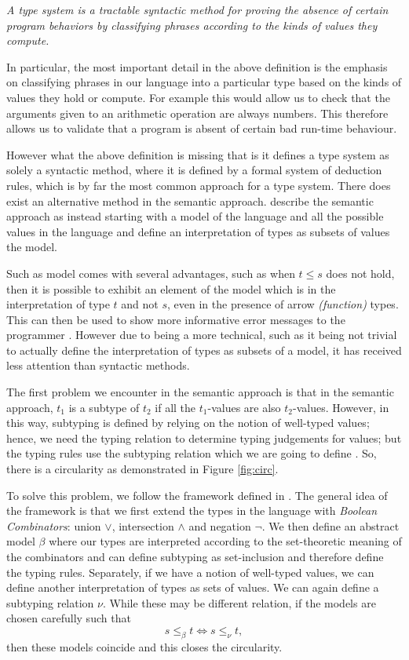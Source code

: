 \documentclass{l4proj}
\begin{document}
\textit{A type system is a tractable syntactic method for proving the absence of certain program
    behaviors by classifying phrases according to the kinds of values they compute.}

In particular, the most important detail in the above definition is the emphasis on classifying 
phrases in our language into a particular type based on the kinds of values they hold or compute. 
For example this would allow us to check that the arguments given to an arithmetic operation are 
always numbers. This therefore allows us to validate that a program is absent of certain bad 
run-time behaviour.

However what the above definition is missing that is it defines a type system as solely a syntactic 
method, where it is defined by a formal system of deduction rules, which is by far the most common 
approach for a type system. There does exist an alternative method in the semantic approach. 
\citet{Frisch2002} describe the semantic approach as instead starting with a model of the language 
and all the possible values in the language and define an interpretation of types as subsets of 
values the model.

Such as model comes with several advantages, such as when $t \leq s$ does not hold, then it is
possible to exhibit an element of the model which is in the interpretation of type $t$ and not $s$, 
even in the presence of arrow \textit{(function)} types. This can then be used to show more 
informative error messages to the programmer \citep{Castagna2005}. However due to being a more 
technical, such as it being not trivial to actually define the interpretation of types as subsets of
a model, it has received less attention than syntactic methods.

The first problem we encounter in the semantic approach is that in the semantic approach, $t_{1}$
is a subtype of $t_{2}$ if all the $t_{1}$-values are also $t_{2}$-values. However, in this way, 
subtyping is defined by relying on the notion of well-typed values; hence, we need the typing 
relation to determine typing judgements for values; but the typing rules use the subtyping relation
which we are going to define \citep{Dardha2017}. So, there is a circularity as demonstrated in 
Figure \ref{fig:circ}.

To solve this problem, we follow the framework defined in \citep{Frisch2008}. The general idea of
the framework is that we first extend the types in the language with \textit{Boolean Combinators}: 
union $\lor$, intersection $\land$ and negation $\neg$. We then define an abstract model $\beta$ 
where our types are interpreted according to the set-theoretic meaning of the combinators and can 
define subtyping as set-inclusion and therefore define the typing rules. Separately, if we have a 
notion of well-typed values, we can define another interpretation of types as sets of values. We can
again define a subtyping relation $\nu$. While these may be different relation, if the models are 
chosen carefully such that 
\begin{equation}
    s \leq_{\beta} t \iff s \leq_{\nu} t,
\end{equation}
then these models coincide and this closes the circularity. 
\end{document}
